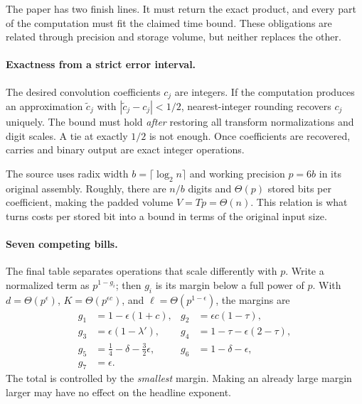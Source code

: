 
The paper has two finish lines. It must return the exact product, and every
part of the computation must fit the claimed time bound. These obligations
are related through precision and storage volume, but neither replaces the other.

\paragraph{Exactness from a strict error interval.}
The desired convolution coefficients $c_j$ are integers. If the computation
produces an approximation $\widetilde c_j$ with
$|\widetilde c_j-c_j|<1/2$, nearest-integer rounding recovers $c_j$ uniquely.
The bound must hold \emph{after} restoring all transform normalizations and
digit scales. A tie at exactly $1/2$ is not enough. Once coefficients are
recovered, carries and binary output are exact integer operations.


The source uses radix width $b=\lceil\log_2 n\rceil$ and working precision
$p=6b$ in its original assembly. Roughly, there are $n/b$ digits and
$\Theta(p)$ stored bits per coefficient, making the padded volume
$V=Tp=\Theta(n)$. This relation is what turns costs per stored bit into a
bound in terms of the original input size.

\paragraph{Seven competing bills.}
The final table separates operations that scale differently with $p$.
Write a normalized term as $p^{1-g_i}$; then $g_i$ is its margin below a
full power of $p$. With $d=\Theta(p^\epsilon)$,
$K=\Theta(p^{\epsilon c})$, and $\ell=\Theta(p^{1-\epsilon})$,
the margins are
\begin{align*}
 g_1&=1-\epsilon(1+c),&g_2&=\epsilon c(1-\tau),\\
 g_3&=\epsilon(1-\lambda'),&g_4&=1-\tau-\epsilon(2-\tau),\\
 g_5&=\tfrac14-\delta-\tfrac32\epsilon,&g_6&=1-\delta-\epsilon,\\
 g_7&=\epsilon.&&
\end{align*}
The total is controlled by the \emph{smallest} margin. Making an already
large margin larger may have no effect on the headline exponent.

